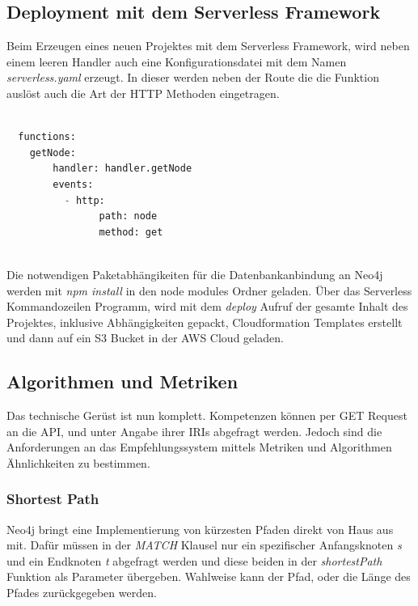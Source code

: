 \subsection{Deployment mit dem Serverless Framework}

Beim Erzeugen eines neuen Projektes mit dem Serverless Framework, wird neben einem leeren Handler auch eine Konfigurationsdatei mit dem Namen \textit{serverless.yaml} erzeugt. In dieser werden neben der Route die die Funktion auslöst auch die Art der HTTP Methoden eingetragen.

\begin{lstlisting}[language=Python, frame=htrbl, caption={Serverless Konfiguration}, label={lst:serverless_yaml}]

  functions:
  	getNode:
    	handler: handler.getNode
    	events: 
          - http: 
            	path: node 
         		method: get 
         		
\end{lstlisting}

Die notwendigen Paketabhängikeiten für die Datenbankanbindung an Neo4j werden mit \textit{npm install} in den node modules Ordner geladen. Über das Serverless Kommandozeilen Programm, wird mit dem \textit{deploy} Aufruf der gesamte Inhalt des Projektes, inklusive Abhängigkeiten gepackt, Cloudformation Templates erstellt und dann auf ein S3 Bucket in der AWS Cloud geladen. 

\subsection{Algorithmen und Metriken}

Das technische Gerüst ist nun komplett. Kompetenzen können per GET Request an die API, und unter Angabe ihrer IRIs abgefragt werden. Jedoch sind die Anforderungen an das Empfehlungssystem mittels Metriken und Algorithmen Ähnlichkeiten zu bestimmen. 

\subsubsection{Shortest Path}

Neo4j bringt eine Implementierung von kürzesten Pfaden direkt von Haus aus mit. Dafür müssen in der \textit{MATCH} Klausel nur ein spezifischer Anfangsknoten \textit{s} und ein Endknoten \textit{t} abgefragt werden und diese beiden in der \textit{shortestPath} Funktion als Parameter übergeben. Wahlweise kann der Pfad, oder die Länge des Pfades zurückgegeben werden.
\newline

